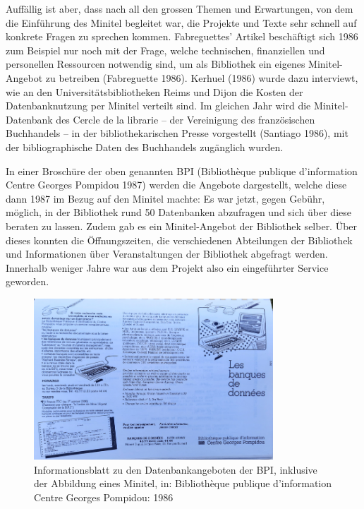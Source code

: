 \documentclass[a4paper,
fontsize=11pt,
oneside,
numbers=noperiodatend,
parskip=half-,
bibliography=totoc,
final
]{scrartcl}
\begin{document}
Auffällig ist aber, dass nach all den grossen Themen und Erwartungen,
von dem die Einführung des Minitel begleitet war, die Projekte und Texte
sehr schnell auf konkrete Fragen zu sprechen kommen. Fabreguettes'
Artikel beschäftigt sich 1986 zum Beispiel nur noch mit der Frage,
welche technischen, finanziellen und personellen Ressourcen notwendig
sind, um als Bibliothek ein eigenes Minitel-Angebot zu betreiben
(Fabreguette 1986). Kerhuel (1986) wurde dazu interviewt, wie an den
Universitätsbibliotheken Reims und Dijon die Kosten der Datenbanknutzung
per Minitel verteilt sind. Im gleichen Jahr wird die Minitel-Datenbank
des Cercle de la librarie -- der Vereinigung des französischen
Buchhandels -- in der bibliothekarischen Presse vorgestellt (Santiago
1986), mit der bibliographische Daten des Buchhandels zugänglich wurden.

In einer Broschüre der oben genannten BPI (Bibliothèque publique
d'information Centre Georges Pompidou 1987) werden die Angebote
dargestellt, welche diese dann 1987 im Bezug auf den Minitel machte: Es
war jetzt, gegen Gebühr, möglich, in der Bibliothek rund 50 Datenbanken
abzufragen und sich über diese beraten zu lassen. Zudem gab es ein
Minitel-Angebot der Bibliothek selber. Über dieses konnten die
Öffnungszeiten, die verschiedenen Abteilungen der Bibliothek und
Informationen über Veranstaltungen der Bibliothek abgefragt werden.
Innerhalb weniger Jahre war aus dem Projekt also ein eingeführter
Service geworden.

\begin{figure}
\centering
\includegraphics[width=0.8\textwidth]{img/LesBanquesDeDonnees.jpg}
\caption{Informationsblatt zu den Datenbankangeboten der BPI, inklusive
der Abbildung eines Minitel, in: Bibliothèque publique d'information
Centre Georges Pompidou: 1986}
\end{figure}
\end{document}
